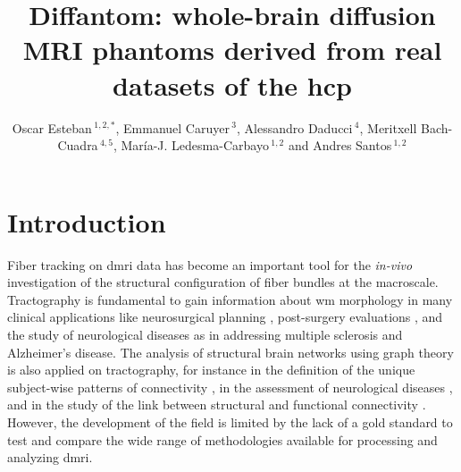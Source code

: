 \documentclass[english]{frontiers/frontiersSCNS} %
\def\firstAuthorLast{Esteban {et~al.}} %
\def\Authors{Oscar Esteban\,$^{1,2,*}$, Emmanuel Caruyer\,$^{3}$, Alessandro Daducci\,$^{4}$, Meritxell Bach-Cuadra\,$^{4,5}$,%
Mar\'ia-J. Ledesma-Carbayo\,$^{1,2}$ and Andres Santos\,$^{1,2}$}
\begin{document}
\onecolumn
{}

\title[Diffantom]{Diffantom: whole-brain diffusion MRI phantoms derived from real datasets of the \acrlong{hcp}}

\author[\firstAuthorLast ]{\Authors} %
\address{} %
\correspondance{} %

\extraAuth{}%


\maketitle

\linenumbers

\section*{Introduction}
Fiber tracking on \gls*{dmri} data has become an important tool for the \textit{in-vivo} investigation
  of the structural configuration of fiber bundles at the macroscale.
Tractography is fundamental to gain information about \gls*{wm} morphology in many clinical applications
  like neurosurgical planning \citep{golby_interactive_2011}, post-surgery evaluations \citep{toda_utility_2014},
  and the study of neurological diseases as in \citep{chua_diffusion_2008} addressing multiple sclerosis and
  Alzheimer's disease.
The analysis of structural brain networks using graph theory is also applied on tractography,
  for instance in the definition of the unique subject-wise patterns of connectivity
  \citep{sporns_human_2005}, in the assessment of neurological diseases \citep{griffa_structural_2013}, and in the
  study of the link between structural and functional connectivity \citep{messe_predicting_2015}.
However, the development of the field is limited by the lack of a gold standard to test and compare the
  wide range of methodologies available for processing and analyzing \gls*{dmri}.
\end{document}
